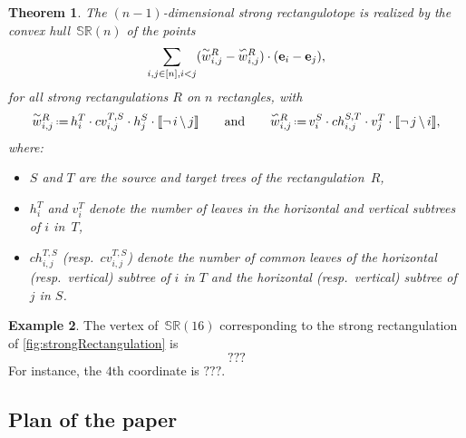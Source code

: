 \documentclass{amsart}
\newtheorem{theorem}{Theorem}%
\theoremstyle{definition}
\newtheorem{example}[theorem]{Example}
\newcommand{\eqdef}{\mbox{\,\raisebox{0.2ex}{\scriptsize\ensuremath{\mathrm:}}\ensuremath{=}\,}} %
\newcommand{\polytope}[1]{\mathds{#1}} %
\newcommand{\SRP}{\polytope{SR}} %
\newcommand{\yang}[1]{\smash{\overset{\backsim}{#1}}}
\newcommand{\yin}[1]{\smash{\overset{\sim}{#1}}}
\begin{document}
\begin{theorem}
  The $(n-1)$-dimensional strong rectangulotope is realized by the convex hull~$\SRP (n)$ of the points
  \[
  \sum_{i,j\in [n], i< j} (\yin{w}^R_{i,j} - \yang{w}^R_{i,j})\cdot (\mathbf{e}_i - \mathbf{e}_j),
  \]
   for all strong rectangulations $R$ on $n$ rectangles, with
  \[
    \yin{w}^R_{i,j} \eqdef h^T_i \cdot cv^{T,S}_{i,j}\cdot h^S_ j\cdot \llbracket \neg \, i \, \backslash \, j \rrbracket
    \qquad\text{and}\qquad
    \yang{w}^R_{i,j} \eqdef v^S_i \cdot ch^{S,T}_{i,j}\cdot v^T_j \cdot \llbracket \neg \, j \, \backslash \, i \rrbracket,
  \]
 where:
  \begin{itemize}
  \item $S$ and $T$ are the source and target trees of the rectangulation~$R$,
  \item $h^T_i$ and $v^T_i$ denote the number of leaves in the horizontal and vertical subtrees of $i$ in~$T$,
  \item $ch^{T,S}_{i,j}$ (resp.~$cv^{T,S}_{i,j}$) denote the number of common leaves of the horizontal (resp.~vertical) subtree of $i$ in $T$ and the horizontal (resp.~vertical) subtree of $j$ in $S$.
  \end{itemize}
\end{theorem}


\begin{example}
The vertex of~$\SRP (16)$ corresponding to the strong rectangulation of \cref{fig:strongRectangulation} is
\[
???
\]
For instance, the $4$th coordinate is $???$.

\end{example}

\subsection{Plan of the paper}
\end{document}
